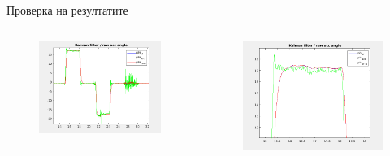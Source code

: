 \documentclass{beamer}
\begin{document}
\begin{frame}{Проверка на резултатите}
	\begin{columns}
		\pause
				\begin{figure}[htpb!]
			\centering
			\includegraphics[width=\textwidth]{Images/kalman_filter_time_vs_raw.png}

		\end{figure}
		

		\pause
		\begin{figure}[htpb!]
			\centering
			\includegraphics[width=\textwidth]{Images/kalman_filter_time_vs_raw_2.png}

		\end{figure}
	\end{columns}
\end{frame}
\end{document}
